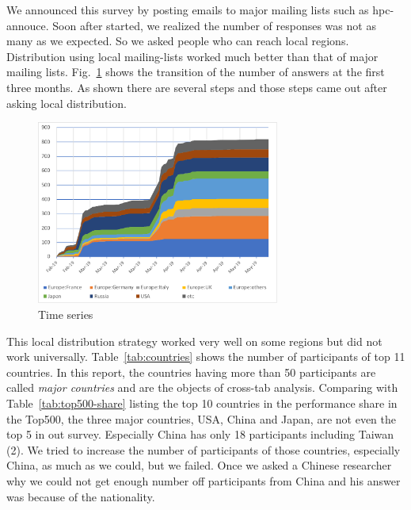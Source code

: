 \documentclass[conference,10pt,letterpaper]{IEEEtran}
\begin{document}
%
%
We announced this survey by posting emails to major mailing lists such
as hpc-annouce. Soon after started, we realized the number of
responses was not as many as we expected. So we asked people who can
reach local regions. Distribution using local mailing-lists worked
much better than that of major mailing
lists. Fig.~\ref{fig:time-series} shows the transition of the number
of answers at the first three months. As shown there are several steps
and those steps came out after asking local distribution. 
%
\begin{figure}[htb]
\begin{center}
\includegraphics[width=8cm]{Figs/TimeSeries-Zoom.pdf}
\caption{Time series}
\label{fig:time-series}
\end{center}
\end{figure}
%
This local distribution strategy worked very well on some regions but
did not work universally. Table~\ref{tab:countries} shows the number
of participants of top 11 countries. In this report, the
countries having more than 50 participants are called {\it major
  countries} and are the objects of cross-tab analysis. 
Comparing with Table~\ref{tab:top500-share} listing the top 10
countries in the performance share in the Top500\cite{Top500}, the
three major countries, USA, China and Japan, are not even the top 5 in
out survey. Especially China has only 18 participants including
Taiwan (2). We tried to increase the number of participants of those
countries, especially China, as much as we could, but we failed. Once
we asked a Chinese researcher why we could not get enough number off
participants from China and his answer was because of the nationality. 
%
\end{document}
